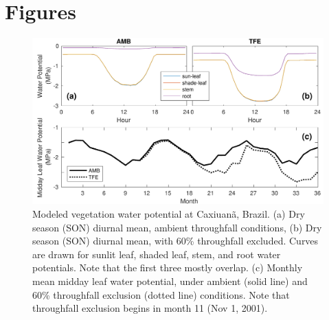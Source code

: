 \documentclass[draft,linenumbers]{agujournal}
\begin{document}
    
\clearpage    

\section{Figures}
  \begin{figure}[h]
     \centering
     \includegraphics[width=30pc]{../figs2/fig2.pdf}
     \caption{Modeled vegetation water potential at  Caxiuan\~a, Brazil.
     (a) Dry season (SON) diurnal mean, ambient throughfall conditions,
     (b) Dry season (SON) diurnal mean, with 60\% throughfall excluded.
     Curves are drawn for sunlit leaf, shaded leaf, stem, and root water potentials. Note that the first three mostly overlap.
     (c) Monthly mean midday leaf water potential, under ambient (solid line) and 60\% throughfall exclusion (dotted line) conditions.
     Note that throughfall exclusion begins in month 11 (Nov 1, 2001).
     }
     \label{fig:vwp}
  \end{figure}
  
\end{document}
